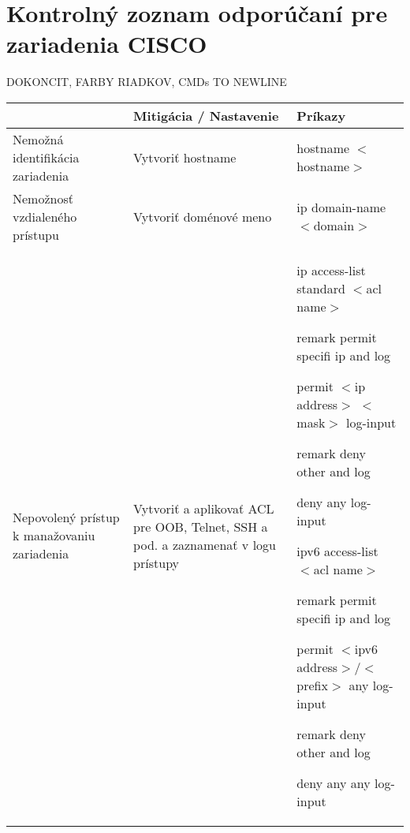 \chapter{Kontrolný zoznam odporúčaní pre zariadenia CISCO}
DOKONCIT, FARBY RIADKOV, CMDs TO NEWLINE


\scriptsize
\begin{longtable}[!htbp]{|L{10em}L{10em}L{34em}|}
	
	
	\hline
	\centering 
	
	 & Mitigácia / Nastavenie&Príkazy\\ \hline
	
	 Nemožná identifikácia zariadenia	&Vytvoriť hostname	&hostname $<$hostname$>$\\
	Nemožnosť vzdialeného prístupu	&Vytvoriť doménové meno	&ip domain-name $<$domain$>$\\
	
	 Nepovolený prístup k manažovaniu zariadenia	&Vytvoriť a aplikovať ACL pre OOB, Telnet, SSH a pod. a zaznamenať v logu prístupy	&ip access-list standard $<$acl name$>$
	
	\hspace{0.5em}remark permit specifi ip and log
	
	\hspace{0.5em}permit $<$ip address$>$ $<$mask$>$ log-input
	
	\hspace{0.5em}remark deny other and log
	
	\hspace{0.5em}deny any log-input
	
	\vspace{0.5em}
	
	ipv6 access-list $<$acl name$>$
	
	\hspace{0.5em}remark permit specifi ip and log
	
	\hspace{0.5em}permit $<$ipv6 address$>$/$<$prefix$>$ any log-input
	
	\hspace{0.5em}remark deny other and log
	
	\hspace{0.5em}deny any any log-input
	

\end{longtable}
